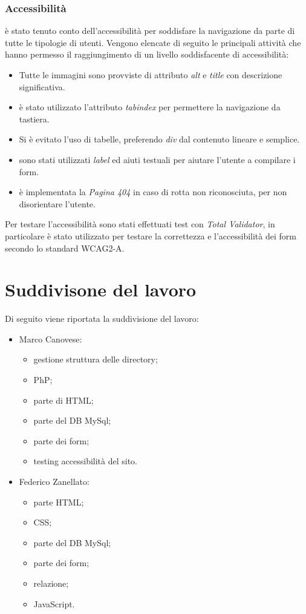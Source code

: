 \subsubsection{Accessibilità}
è stato tenuto conto dell'accessibilità per soddisfare la navigazione da parte di tutte le tipologie di utenti. Vengono elencate di seguito le principali attività che hanno permesso il raggiungimento di un livello soddisfacente di accessibilità:
\begin{itemize}
	\item Tutte le immagini sono provviste di attributo \textit{alt} e \textit{title} con descrizione significativa.
	\item è stato utilizzato l'attributo \textit{tabindex} per permettere la navigazione da tastiera.
	\item Si è evitato l'uso di tabelle, preferendo \textit{div}  dal contenuto lineare e semplice.
	\item sono stati utilizzati \textit{label} ed aiuti testuali per aiutare l'utente a compilare i form.
	\item è implementata la \textit{Pagina 404} in caso di rotta non riconosciuta, per non disorientare l'utente.
\end{itemize}
Per testare l'accessibilità sono stati effettuati test con \textit{Total Validator}, in particolare è stato utilizzato per testare la correttezza e l'accessibilità dei form secondo lo standard WCAG2-A.



\section{Suddivisone del lavoro}
Di seguito viene riportata la suddivisione del lavoro:
\begin{itemize}
	\item Marco Canovese:
	\begin{itemize}
		\item gestione struttura delle directory;
		\item PhP;
		\item parte di HTML;
		\item parte del DB MySql;
		\item parte dei form;
		\item testing accessibilità del sito.
	\end{itemize}
\end{itemize}

\begin{itemize}
	\item Federico Zanellato:
	\begin{itemize}
		\item parte HTML;
		\item CSS;
		\item parte del DB MySql;
		\item parte dei form;
		\item relazione;
		\item JavaScript.
	\end{itemize}
\end{itemize}

